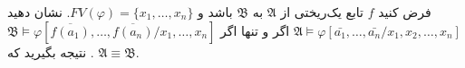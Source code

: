فرض کنید
$f$
تابع یک‌ریختی از 
$\mathfrak{A}$
به 
$\mathfrak{B}$
باشد و 
$FV(\varphi) = \{x_{1},\dots, x_{n}\}$.
نشان دهید
$\mathfrak{A}\models\varphi[\bar{a_1}, \dots, \bar{a_n} / x_{1},x_{2},\dots, x_{n}]$
اگر و تنها اگر 
$\mathfrak{B}\models\varphi[\overline{f(a_1)}, \dots, \overline{f(a_n)} / x_1, \dots, x_n]$.
نتیجه بگیرید که 
$\mathfrak{A}\equiv\mathfrak{B}$.